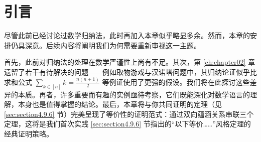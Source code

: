 \section{引言}

尽管此前已经讨论过数学归纳法，此时再加入本章似乎略显多余。然而，本章的安排仍具深意。后续内容将阐明我们为何需要重新审视这一主题。

首先，此前对归纳法的处理在数学严谨性上尚有不足。其次，第 \ref{ch:chapter02} 章遗留了若干有待解决的问题——例如取物游戏与汉诺塔问题中，其归纳论证似乎比求和公式 $\sum_{k \in [n]} k=\frac{n(n+1)}{2}$ 等例证使用了更强的假设。我们将在此探讨这些差异的本质。再者，许多重要而有趣的实例亟待考察，它们既能深化对数学语言的理解，本身也是值得掌握的结论。最后，本章将与你共同证明的定理（见 \ref{sec:section4.9.6} 节）完美呈现了等价性的证明范式：通过双向蕴涵关系串联三个定理，这将是我们首次实践 \ref{sec:section4.9.6} 节指出的``以下等价……''风格定理的经典证明策略。

